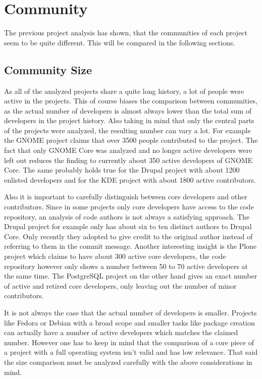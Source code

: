 
\section{Community} %

The previous project analysis has shown, that the communities of each project
seem to be quite different. This will be compared in the following sections.

\subsection{Community Size} %

As all of the analyzed projects share a quite long history, a lot of people
were active in the projects. This of course biases the comparison between
communities, as the actual number of developers is almost always lower than the
total sum of developers in the project history. Also taking in mind that only
the central parts of the projects were analyzed, the resulting number can vary
a lot. For example the GNOME project claims that over 3500 people contributed
to the project. The fact that only GNOME Core was analyzed and no longer active
developers were left out reduces the finding to currently about 350 active
developers of GNOME Core. The same probably holds true for the Drupal project
with about 1200 enlisted developers and for the KDE project with about
1800 active contributors.

Also it is important to carefully distinguish between core developers and other
contributors. Since in some projects only core developers have access to the
code repository, an analysis of code authors is not always a satisfying
approach. The Drupal project for example only has about six to ten distinct
authors to Drupal Core. Only recently they adopted to give credit to the
original author instead of referring to them in the commit message. Another
interesting insight is the Plone project which claims to have about 300 active
core developers, the code repository however only shows a number between
50 to 70 active developers at the same time. The PostgreSQL project on the
other hand gives an exact number of active and retired core developers, only
leaving out the number of minor contributors.

It is not always the case that the actual number of developers is smaller.
Projects like Fedora or Debian with a broad scope and smaller tasks like
package creation can actually have a number of active developers which matches
the claimed number. However one has to keep in mind that the comparison of a
core piece of a project with a full operating system isn't valid and has low
relevance. That said the size comparison must be analyzed carefully with the
above considerations in mind.

